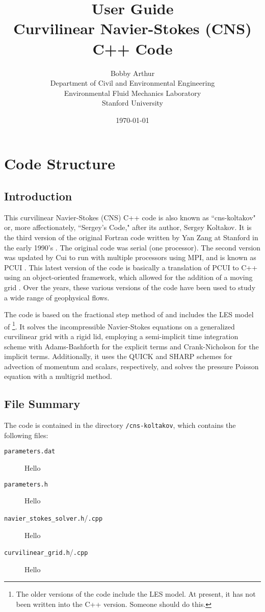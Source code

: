 \documentclass[12pt]{report}
\title{User Guide\\ \vspace{0.1in} \large{Curvilinear Navier-Stokes (CNS) C++ Code}}
\author{Bobby Arthur \\ Department of Civil and Environmental Engineering
                     \\ Environmental Fluid Mechanics Laboratory
                     \\ Stanford University}
\date{\today}
\begin{document}
\maketitle
\tableofcontents

\chapter{Code Structure}

\section{Introduction}
This curvilinear Navier-Stokes (CNS) C++ code is also known as ``cns-koltakov" or, more affectionately, ``Sergey's Code," after its author, Sergey Koltakov. It is the third version of the original Fortran code written by Yan Zang at Stanford in the early 1990's \citep{zang1994}. The original code was serial (one processor). The second version was updated by Cui to run with multiple processors using MPI, and is known as PCUI \citep{cui2001}. This latest version of the code is basically a translation of PCUI to C++ using an object-oriented framework, which allowed for the addition of a moving grid \citep{koltakov2012}. Over the years, these various versions of the code have been used to study a wide range of geophysical flows.

The code is based on the fractional step method of \citet{zang1994} and includes the LES model of \citet{zang1993}\footnote{The older versions of the code include the LES model. At present, it has not been written into the C++ version. Someone should do this.}. It solves the incompressible Navier-Stokes equations on a generalized curvilinear grid with a rigid lid, employing a semi-implicit time integration scheme with Adams-Bashforth for the explicit terms and Crank-Nicholson for the implicit terms. Additionally, it uses the QUICK and SHARP schemes for advection of momentum and scalars, respectively, and solves the pressure Poisson equation with a multigrid method. 

\section{File Summary}
The code is contained in the directory \texttt{/cns-koltakov}, which contains the following files:
\begin{description}
\item[\texttt{parameters.dat}] Hello
\item[\texttt{parameters.h}] Hello
\item[\texttt{navier\_stokes\_solver.h}/\texttt{.cpp}] Hello
\item[\texttt{curvilinear\_grid.h}/\texttt{.cpp}] Hello
\end{description}
\end{document}
